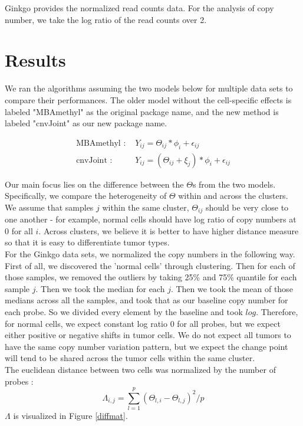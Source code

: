 \documentclass[11pt]{article}
\begin{document}
\noindent Ginkgo provides the normalized read counts data. For the analysis of copy number, we take the log ratio of the read counts over 2. 

\section{Results}
\noindent We ran the algorithms assuming the two models below for multiple data sets to compare their performances. The older model without the cell-specific effects is labeled "MBAmethyl" as the original package name, and the new method is labeled "cnvJoint" as our new package name. 

\begin{align*}
\text{MBAmethyl : }&Y_{ij} = \Theta_{ij} * \phi_i + \epsilon_{ij}\\
\text{cnvJoint : }&Y_{ij} = (\Theta_{ij} + \xi_j)*\phi_i + \epsilon_{ij}
\end{align*}

\noindent Our main focus lies on the difference between the $\Theta$s from the two models. Specifically, we compare the heterogeneity of $\Theta$ within and across the clusters. We assume that samples $j$ within the same cluster, $\Theta_{ij}$ should be very close to one another - for example, normal cells should have log ratio of copy numbers at 0 for all $i$. Across clusters, we believe it is better to have higher distance measure so that it is easy to differentiate tumor types. \\


\noindent For the Ginkgo data sets, we normalized the copy numbers in the following way. First of all, we discovered the 'normal cells' through clustering. Then for each of those samples, we removed the outliers by taking 25\% and 75\% quantile for each sample $j$. Then we took the median for each $j$. Then we took the mean of those medians across all the samples, and took that as our baseline copy number for each probe. So we divided every element by the baseline and took $log$. Therefore, for normal cells, we expect constant log ratio 0 for all probes, but we expect either positive or negative shifts in tumor cells. We do not expect all tumors to have the same copy number variation pattern, but we expect the change point will tend to be shared across the tumor cells within the same cluster.\\

\noindent The euclidean distance between two cells was normalized by the number of probes : 
$$\Lambda_{i,j} = \sum_{l=1}^{p} (\Theta_{l, i} - \Theta_{l, j})^2 / p$$
$\Lambda$ is visualized in Figure \ref{diffmat}.
\end{document}
